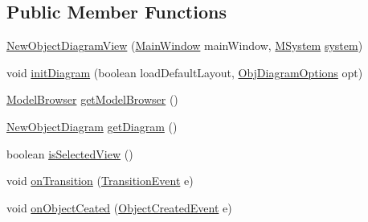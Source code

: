 \subsection*{Public Member Functions}
\begin{DoxyCompactItemize}
\item 
\hyperlink{classorg_1_1tzi_1_1use_1_1gui_1_1views_1_1diagrams_1_1objectdiagram_1_1_new_object_diagram_view_a246cd1667507951aab056dd1023e9b8a}{New\-Object\-Diagram\-View} (\hyperlink{classorg_1_1tzi_1_1use_1_1gui_1_1main_1_1_main_window}{Main\-Window} main\-Window, \hyperlink{classorg_1_1tzi_1_1use_1_1uml_1_1sys_1_1_m_system}{M\-System} \hyperlink{classorg_1_1tzi_1_1use_1_1gui_1_1views_1_1diagrams_1_1objectdiagram_1_1_new_object_diagram_view_a886ac6be64296646fad521f8ef3caf4e}{system})
\item 
void \hyperlink{classorg_1_1tzi_1_1use_1_1gui_1_1views_1_1diagrams_1_1objectdiagram_1_1_new_object_diagram_view_abd2303835ddfab405c2e3a1a136d99ec}{init\-Diagram} (boolean load\-Default\-Layout, \hyperlink{classorg_1_1tzi_1_1use_1_1gui_1_1views_1_1diagrams_1_1objectdiagram_1_1_obj_diagram_options}{Obj\-Diagram\-Options} opt)
\item 
\hyperlink{classorg_1_1tzi_1_1use_1_1gui_1_1main_1_1_model_browser}{Model\-Browser} \hyperlink{classorg_1_1tzi_1_1use_1_1gui_1_1views_1_1diagrams_1_1objectdiagram_1_1_new_object_diagram_view_a5e91cf2df7adf96581bc31cd8e266cb8}{get\-Model\-Browser} ()
\item 
\hyperlink{classorg_1_1tzi_1_1use_1_1gui_1_1views_1_1diagrams_1_1objectdiagram_1_1_new_object_diagram}{New\-Object\-Diagram} \hyperlink{classorg_1_1tzi_1_1use_1_1gui_1_1views_1_1diagrams_1_1objectdiagram_1_1_new_object_diagram_view_aa6deac2f69d15c2d95d91ffb55f8d358}{get\-Diagram} ()
\item 
boolean \hyperlink{classorg_1_1tzi_1_1use_1_1gui_1_1views_1_1diagrams_1_1objectdiagram_1_1_new_object_diagram_view_a27f96a32095b06c1a25fd2ccfadb1ac2}{is\-Selected\-View} ()
\item 
void \hyperlink{classorg_1_1tzi_1_1use_1_1gui_1_1views_1_1diagrams_1_1objectdiagram_1_1_new_object_diagram_view_a6f0eeb6d2c550b8e1a2cddf368dddf23}{on\-Transition} (\hyperlink{classorg_1_1tzi_1_1use_1_1uml_1_1sys_1_1events_1_1_transition_event}{Transition\-Event} e)
\item 
void \hyperlink{classorg_1_1tzi_1_1use_1_1gui_1_1views_1_1diagrams_1_1objectdiagram_1_1_new_object_diagram_view_a7c58fdbf32a845798bb36d12162b786b}{on\-Object\-Ceated} (\hyperlink{classorg_1_1tzi_1_1use_1_1uml_1_1sys_1_1events_1_1_object_created_event}{Object\-Created\-Event} e)

\end{DoxyCompactItemize}
